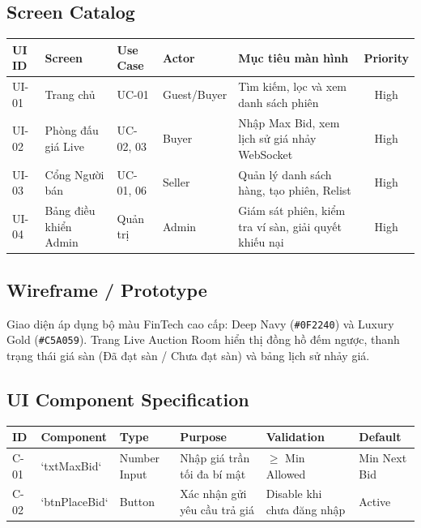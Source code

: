 \documentclass[11pt,a4paper]{article}
\begin{document}
\subsection{Screen Catalog}
\begin{table}[H]
    \centering
    \small
    \begin{tabularx}{\textwidth}{|l|l|l|l|X|c|}
        \hline
        \textbf{UI ID} & \textbf{Screen} & \textbf{Use Case} & \textbf{Actor} & \textbf{Mục tiêu màn hình} & \textbf{Priority} \\ \hline
        UI-01 & Trang chủ & UC-01 & Guest/Buyer & Tìm kiếm, lọc và xem danh sách phiên & High \\ \hline
        UI-02 & Phòng đấu giá Live & UC-02, 03 & Buyer & Nhập Max Bid, xem lịch sử giá nhảy WebSocket & High \\ \hline
        UI-03 & Cổng Người bán & UC-01, 06 & Seller & Quản lý danh sách hàng, tạo phiên, Relist & High \\ \hline
        UI-04 & Bảng điều khiển Admin & Quản trị & Admin & Giám sát phiên, kiểm tra ví sàn, giải quyết khiếu nại & High \\ \hline
    \end{tabularx}
\end{table}

\subsection{Wireframe / Prototype}
Giao diện áp dụng bộ màu FinTech cao cấp: Deep Navy (\verb|#0F2240|) và Luxury Gold (\verb|#C5A059|). Trang Live Auction Room hiển thị đồng hồ đếm ngược, thanh trạng thái giá sàn (Đã đạt sàn / Chưa đạt sàn) và bảng lịch sử nhảy giá.

\subsection{UI Component Specification}
\begin{table}[H]
    \centering
    \small
    \begin{tabularx}{\textwidth}{|l|l|l|X|l|l|}
        \hline
        \textbf{ID} & \textbf{Component} & \textbf{Type} & \textbf{Purpose} & \textbf{Validation} & \textbf{Default} \\ \hline
        C-01 & `txtMaxBid` & Number Input & Nhập giá trần tối đa bí mật & $\ge$ Min Allowed & Min Next Bid \\ \hline
        C-02 & `btnPlaceBid` & Button & Xác nhận gửi yêu cầu trả giá & Disable khi chưa đăng nhập & Active \\ \hline
    \end{tabularx}
\end{table}
\end{document}
